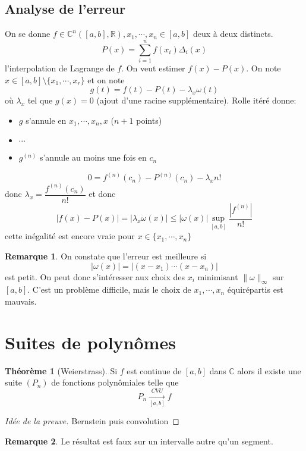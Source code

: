 \documentclass{article}
\theoremstyle{definition}
\newtheorem*{thm}{Théorème}
\newtheorem*{rem}{Remarque}
\begin{document}
\subsection{Analyse de l'erreur}

On se donne $f\in\mathbb C^n([a, b], \mathbb R) ,x_1, \cdots, x_n\in [a, b]$ deux à deux distincts. \[
    P(x)=\sum_{i=1}^nf (x_i)\Delta_i(x)
\]
l'interpolation de Lagrange de $f$. On veut estimer $f(x)-P(x)$. On note $x\in [a, b]\setminus\{x_1, \cdots, x_r\}$ et on note \[
    g(t)=f(t)-P(t)-\lambda_x\omega(t)
\]
où $\lambda_x$ tel que $g(x)=0$ (ajout d'une racine supplémentaire). Rolle itéré donne:

\begin{itemize}
    \item
$g$ s'annule en $x_1, \cdots, x_n, x$ ($n+1$ points)
\item $\cdots$
\item
$g^{(n)}$ s'annule au moins une fois en $c_n$
\end{itemize}

\[
    0=f^{(n)}(c_n)-P^{(n)}(c_n)-\lambda_x n!
\]
donc $\lambda_x = \dfrac{f^{(n)}(c_n)}{n!}$ et donc \[
    |f(x)-P(x)|=|\lambda_x\omega (x)|\leq |\omega(x)|\sup_{[a, b]}\frac{|f^{(n)}|}{n!}
\]
cette inégalité est encore vraie pour $x\in\{x_1, \cdots, x_n\}$

\begin{rem}
On constate que l'erreur est meilleure si \[
    |\omega(x)|=|(x-x_1)\cdots (x-x_n)|
\]
est petit. On peut donc s'intéresser aux choix des $x_i$ minimisant $\|\omega\|_\infty$ sur $[a, b]$. C'est un problème difficile, mais le choix de $x_1, \cdots, x_n$ équirépartis est mauvais.
\end{rem}

\section{Suites de polynômes}

\begin{thm}[Weierstrass]
    Si $f$ est continue de $[a, b]$ dans $\mathbb C$ alors il existe une suite $(P_n)$ de fonctions polynômiales telle que \[
        P_n\xrightarrow[{[a, b]}]{CVU} f
    \]
\end{thm}

\begin{proof}[Idée de la preuve]
    Bernstein puis convolution
\end{proof}

\begin{rem}
Le résultat est faux sur un intervalle autre qu'un segment.
\end{rem}
\end{document}
